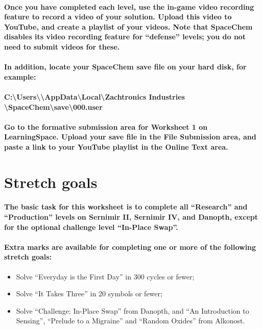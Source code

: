 \documentclass{../../../fal_assignment}
\begin{document}
\paragraph{
Once you have completed each level, use the in-game video recording feature to \textbf{record a video} of your solution.
\textbf{Upload} this video to YouTube, and create a playlist of your videos.
Note that SpaceChem disables its video recording feature for ``defense'' levels; you do \textbf{not} need to submit videos for these.
}

\paragraph{
In addition, locate your SpaceChem \textbf{save file} on your hard disk, for example:
}

\paragraph{
C:\textbackslash Users\textbackslash <your name>\textbackslash AppData\textbackslash Local\textbackslash Zachtronics Industries\\ \textbackslash SpaceChem\textbackslash save\textbackslash 000.user
}

\paragraph{
Go to the formative submission area for Worksheet 1 on LearningSpace.
\textbf{Upload} your save file in the File Submission area, and \textbf{paste} a link to your YouTube playlist in the Online Text area.
}

\section*{Stretch goals}

\paragraph{
The basic task for this worksheet is to complete \textbf{all} ``Research'' and ``Production'' levels on Sernimir II, Sernimir IV, and Danopth, except for the optional challenge level ``In-Place Swap''.
}

\paragraph{
Extra marks are available for completing one or more of the following stretch goals:
}
	\begin{itemize}
		\item Solve ``Everyday is the First Day'' in 300 cycles or fewer;
		\item Solve ``It Takes Three'' in 20 symbols or fewer;
		\item Solve ``Challenge: In-Place Swap'' from Danopth, and ``An Introduction to Sensing'', ``Prelude to a Migraine'' and ``Random Oxides'' from Alkonost.
	\end{itemize}
\end{document}
